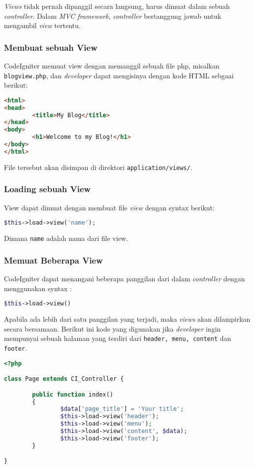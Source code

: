 \textit{Views} tidak pernah dipanggil secara langsung, harus dimuat dalam sebuah \textit{controller}. Dalam \textit{MVC framework}, \textit{controller} bertanggung jawab untuk mengambil \textit{view} tertentu. 

\subsubsection{Membuat sebuah View}
CodeIgniter memuat view dengan memanggil sebuah file php, misalkan \verb|blogview.php|, dan \textit{developer} dapat mengisinya dengan kode HTML sebgaai berikut:
\begin{lstlisting}[frame=single, language=HTML] 
<html>
<head>
        <title>My Blog</title>
</head>
<body>
        <h1>Welcome to my Blog!</h1>
</body>
</html>
\end{lstlisting}

File tersebut akan disimpan di direktori \texttt{application/views/}.

\subsubsection{Loading sebuah View}


View dapat dimuat dengan membuat file \textit{view} dengan syntax berikut:

\begin{lstlisting}[frame=single, language=PHP] 
$this->load->view('name');
\end{lstlisting}

\noindent Dimana \texttt{name} adalah nama dari file view.

\subsubsection{Memuat Beberapa View}

CodeIgniter dapat menangani beberapa panggilan dari dalam \textit{controller} dengan menggunakan syntax : 

\begin{lstlisting}[frame=single, language=PHP] 
$this->load->view()
\end{lstlisting}

Apabila ada lebih dari satu panggilan yang terjadi, maka \textit{views} akan dilampirkan secara bersamaan. Berikut ini kode yang digunakan jika \textit{developer} ingin mempunyai sebuah halaman yang terdiri dari \texttt{header, menu, content} dan \texttt{footer}. 


\begin{lstlisting}[frame=single, language=PHP] 
<?php

class Page extends CI_Controller {

        public function index()
        {
                $data['page_title'] = 'Your title';
                $this->load->view('header');
                $this->load->view('menu');
                $this->load->view('content', $data);
                $this->load->view('footer');
        }

}
\end{lstlisting}

